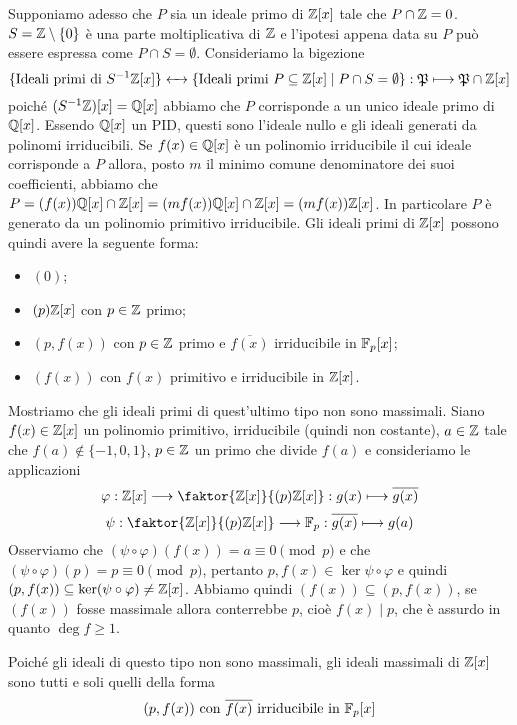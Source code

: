 \documentclass[11pt]{scrartcl}
\begin{document}
Supponiamo adesso che $P$ sia un ideale primo di $\mathbb Z[x]$ tale che 
$P \cap \mathbb Z = 0$. $S = \mathbb Z\setminus \{0\}$ è una parte moltiplicativa di 
$\mathbb Z$ e l'ipotesi appena data su $P$ può essere espressa come $P \cap S = \emptyset$.
Consideriamo la bigezione 
\[
    \{\text{Ideali primi di }S^{-1}\mathbb Z[x]\}\leftarrow\mathrel{\mkern-7mu}\rightarrow 
    \{\text{Ideali primi } P\subseteq \mathbb Z[x] \mid P\cap S = \emptyset\}: 
    \mathfrak{P}\longmapsto \mathfrak{P}\cap\mathbb Z[x]
\]
poiché $(S^{-1}\mathbb Z)[x] = \mathbb Q[x]$ abbiamo che $P$ corrisponde a un unico ideale
primo di $\mathbb Q[x]$. Essendo $\mathbb Q[x]$ un PID, questi sono
l'ideale nullo e gli ideali generati da polinomi irriducibili. Se $f(x)\in \mathbb Q[x]$
è un polinomio irriducibile il cui ideale corrisponde a $P$ allora, posto 
$m$ il minimo comune denominatore dei suoi coefficienti, abbiamo che 
$P = (f(x))\mathbb Q[x] \cap \mathbb Z[x] = (mf(x))\mathbb Q[x]\cap\mathbb Z[x] = (mf(x))\mathbb Z[x]$. 
In particolare $P$ è generato da un polinomio primitivo irriducibile.
Gli ideali primi di $\mathbb Z[x]$ possono quindi avere la seguente forma:
\begin{itemize}
    \item $(0)$;
    \item $(p)\mathbb Z[x]$ con $p \in \mathbb Z$ primo;
    \item $(p, f(x))$ con $p \in \mathbb Z$ primo e $\overline{f(x)}$ irriducibile
    in $\mathbb F_p[x]$;
    \item $(f(x))$ con $f(x)$ primitivo e irriducibile in $\mathbb Z[x]$.
\end{itemize}

Mostriamo che gli ideali primi di quest'ultimo tipo non sono massimali.\newline
Siano $f(x) \in \mathbb Z[x]$ un polinomio primitivo, irriducibile (quindi non costante),
$a \in \mathbb Z$ tale che $f(a) \notin\{-1, 0, 1\}$, $p \in \mathbb Z$ un primo che 
divide $f(a)$ e consideriamo le applicazioni
\[
    \varphi: \ZZ[x]\longrightarrow \faktor{\ZZ[x]}{(p)\ZZ[x]}: 
    g(x)\longmapsto \overline{g(x)}
\] 
\[
    \psi: \faktor{\ZZ[x]}{(p)\ZZ[x]}\longrightarrow \FF_p: 
    \overline{g(x)}\longmapsto g(a)
\]
Osserviamo che $(\psi\circ\varphi)(f(x)) = a \equiv 0 \pmod{p}$ e che 
$(\psi\circ\varphi)(p) = p \equiv 0 \pmod{p}$, pertanto $p, f(x) \in 
\ker{\psi\circ\varphi}$ e quindi $(p, f(x)) \subseteq \ker(\psi\circ \varphi) \neq \mathbb Z[x]$.
Abbiamo quindi $(f(x)) \subseteq (p, f(x))$, se $(f(x))$ fosse massimale allora
conterrebbe $p$, cioè $f(x) \mid p$, che è assurdo in quanto $\deg f \geq 1$.

Poiché gli ideali di questo tipo non sono massimali, gli ideali massimali di
$\mathbb Z[x]$ sono tutti e soli quelli della forma
\[
    (p, f(x)) \text{ con }\overline{f(x)} \text{ irriducibile in }\mathbb F_p[x]
\]
\end{document}
